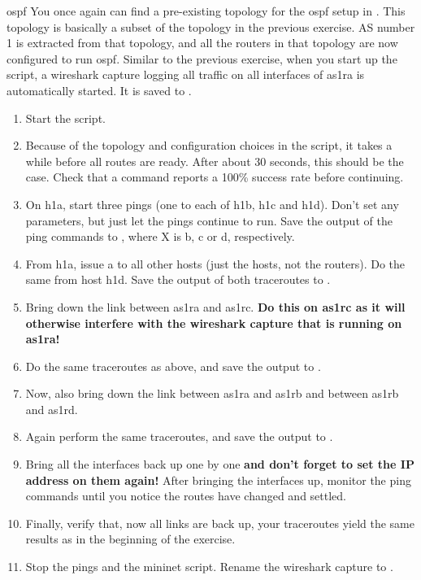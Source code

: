 \begin{exercise}{\acs{ospf}}
	You once again can find a pre-existing topology for the \acs{ospf} setup in . This topology is basically a subset of the topology in the previous exercise. AS number 1 is extracted from that topology, and all the routers in that topology are now configured to run \acs{ospf}. Similar to the previous exercise, when you start up the script, a wireshark capture logging all traffic on all interfaces of as1ra is automatically started. It is saved to .
	

	\begin{enumerate}
		\item Start the  script.
		\item Because of the topology and configuration choices in the script, it takes a while before all routes are ready. After about 30 seconds, this should be the case. Check that a  command reports a 100\% success rate before continuing.
		\item On h1a, start three pings (one to each of h1b, h1c and h1d). Don't set any parameters, but just let the pings continue to run. Save the output of the ping commands to , where X is b, c or d, respectively.
		\item From h1a, issue a  to all other hosts (just the hosts, not the routers). Do the same from host h1d. Save the output of both traceroutes to .
		\item Bring down the link between as1ra and as1rc. \textbf{Do this on as1rc as it will otherwise interfere with the wireshark capture that is running on as1ra!}
		\item Do the same traceroutes as above, and save the output to .
		\item Now, also bring down the link between as1ra and as1rb and between as1rb and as1rd.
		\item Again perform the same traceroutes, and save the output to .
		\item Bring all the interfaces back up one by one \textbf{and don't forget to set the IP address on them again!} After bringing the interfaces up, monitor the ping commands until you notice the routes have changed and settled.
		\item Finally, verify that, now all links are back up, your traceroutes yield the same results as in the beginning of the exercise.
		\item Stop the pings and the mininet script. Rename the wireshark capture to .
	\end{enumerate}


\end{exercise}
